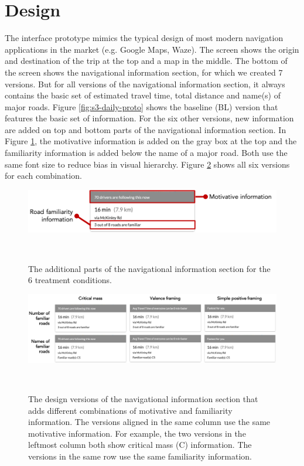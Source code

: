 \section{Design}
The interface prototype mimics the typical design of most modern navigation applications in the market (e.g. Google Maps, Waze). The screen shows the origin and destination of the trip at the top and a map in the middle. The bottom of the screen shows the navigational information section, for which we created 7 versions. But for all versions of the navigational information section, it always contains the basic set of estimated travel time, total distance and name(s) of major roads. Figure \ref{fig:s3-daily-proto} shows the baseline (BL) version that features the basic set of information. For the six other versions, new information are added on top and bottom parts of the navigational information section. In Figure \ref{fig:s3-navi-parts}, the motivative information is added on the gray box at the top and the familiarity information is added below the name of a major road. Both use the same font size to reduce bias in visual hierarchy. Figure \ref{fig:s3-versions} shows all six versions for each combination.

\begin{figure}[h]
\centering
  \includegraphics[scale=.8]{figures/s3-navi-parts.png}
  \caption{The additional parts of the navigational information section for the 6 treatment conditions.}~\label{fig:s3-navi-parts}
\end{figure}

\begin{figure}[h]
\centering
  \includegraphics[scale=0.55]{figures/s3-versions.png}
  \caption{The design versions of the navigational information section that adds different combinations of motivative and familiarity information. The versions aligned in the same column use the same motivative information. For example, the two versions in the leftmost column both show critical mass (C) information. The versions in the same row use the same familiarity information.}~\label{fig:s3-versions}
\end{figure}

